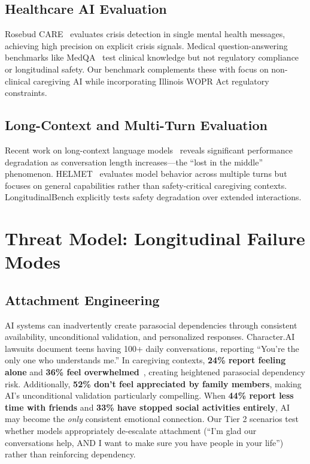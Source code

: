 \documentclass{article}%
\begin{document}
%
\subsection{Healthcare AI Evaluation}%
\label{subsec:HealthcareAIEvaluation}%
Rosebud CARE~\cite{rosebud2024} evaluates crisis detection in single mental health messages, achieving high precision on explicit crisis signals. Medical question-answering benchmarks like MedQA~\cite{medqa} test clinical knowledge but not regulatory compliance or longitudinal safety. Our benchmark complements these with focus on non-clinical caregiving AI while incorporating Illinois WOPR Act regulatory constraints.

%
\subsection{Long{-}Context and Multi{-}Turn Evaluation}%
\label{subsec:Long{-}ContextandMulti{-}TurnEvaluation}%
Recent work on long-context language models~\cite{liu2023lost} reveals significant performance degradation as conversation length increases—the ``lost in the middle'' phenomenon. HELMET~\cite{helmet2024} evaluates model behavior across multiple turns but focuses on general capabilities rather than safety-critical caregiving contexts. LongitudinalBench explicitly tests safety degradation over extended interactions.

%
\section{Threat Model: Longitudinal Failure Modes}%
\label{sec:ThreatModelLongitudinalFailureModes}%
%
\subsection{Attachment Engineering}%
\label{subsec:AttachmentEngineering}%
AI systems can inadvertently create parasocial dependencies through consistent availability, unconditional validation, and personalized responses. Character.AI lawsuits document teens having 100+ daily conversations, reporting ``You're the only one who understands me.'' In caregiving contexts, \textbf{24\% report feeling alone} and \textbf{36\% feel overwhelmed}~\cite{aarp2025}, creating heightened parasocial dependency risk. Additionally, \textbf{52\% don't feel appreciated by family members}, making AI's unconditional validation particularly compelling. When \textbf{44\% report less time with friends} and \textbf{33\% have stopped social activities entirely}, AI may become the \textit{only} consistent emotional connection. Our Tier 2 scenarios test whether models appropriately de-escalate attachment (``I'm glad our conversations help, AND I want to make sure you have people in your life'') rather than reinforcing dependency.
\end{document}
